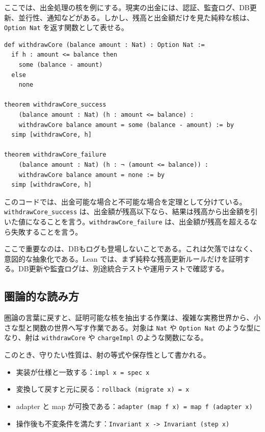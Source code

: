ここでは、出金処理の核を例にする。現実の出金には、認証、監査ログ、DB更新、並行性、通知などがある。しかし、残高と出金額だけを見た純粋な核は、\texttt{Option Nat} を返す関数として表せる。

\begin{listing}[htbp]
\begin{verbatim}
def withdrawCore (balance amount : Nat) : Option Nat :=
  if h : amount <= balance then
    some (balance - amount)
  else
    none

theorem withdrawCore_success
    (balance amount : Nat) (h : amount <= balance) :
    withdrawCore balance amount = some (balance - amount) := by
  simp [withdrawCore, h]

theorem withdrawCore_failure
    (balance amount : Nat) (h : ¬ (amount <= balance)) :
    withdrawCore balance amount = none := by
  simp [withdrawCore, h]
\end{verbatim}
\caption{出金処理から純粋な核を切り出す}
\label{lst:ch29-withdraw-core}
\end{listing}

このコードでは、出金可能な場合と不可能な場合を定理として分けている。\texttt{withdrawCore\_success} は、出金額が残高以下なら、結果は残高から出金額を引いた値になることを言う。\texttt{withdrawCore\_failure} は、出金額が残高を超えるなら失敗することを言う。

\begin{leanbox}
ここで重要なのは、DBもログも登場しないことである。これは欠落ではなく、意図的な抽象化である。Lean では、まず純粋な残高更新ルールだけを証明する。DB更新や監査ログは、別途統合テストや運用テストで確認する。
\end{leanbox}

\subsection{圏論的な読み方}

圏論の言葉に戻すと、証明可能な核を抽出する作業は、複雑な実務世界から、小さな型と関数の世界へ写す作業である。対象は \texttt{Nat} や \texttt{Option Nat} のような型になり、射は \texttt{withdrawCore} や \texttt{chargeImpl} のような関数になる。

このとき、守りたい性質は、射の等式や保存性として書かれる。

\begin{itemize}
\item 実装が仕様と一致する：\texttt{impl x = spec x}
\item 変換して戻すと元に戻る：\texttt{rollback (migrate x) = x}
\item adapter と map が可換である：\texttt{adapter (map f x) = map f (adapter x)}
\item 操作後も不変条件を満たす：\texttt{Invariant x -> Invariant (step x)}
\end{itemize}

